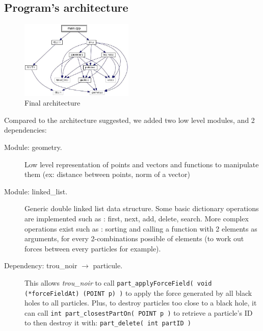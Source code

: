 \documentclass[a4paper]{article} %
\begin{document}
\begin{multicols*}{2}
\section{Program's architecture}


\begin{figure}[H]
\centering
\includegraphics[width=0.48\textwidth]{architecture.jpg}
\caption{Final architecture}
\end{figure}


Compared to the architecture suggested, we added two low level modules, and 2 dependencies:
\begin{description}
\item[Module: geometry.]
Low level representation of points and vectors and functions to manipulate them (ex: distance between points, norm of a vector)


\item[Module: linked\_list.]
Generic double linked list data structure.
Some basic dictionary operations are implemented such as : first, next, add, delete, search.
More complex operations exist such as : sorting and calling a function with 2 elements as arguments, for every 2-combinations possible of elements
(to work out forces between every particles for example).


\item[Dependency: trou\_noir $\rightarrow$ particule.]
This allows \emph{trou\_noir} to call \texttt{part\_applyForceField( void (*forceFieldAt) (POINT p) )}
to apply the force generated by all black holes to all particles.
Plus, to destroy particles too close to a black hole, it can call \texttt{int part\_closestPartOn( POINT p )}
to retrieve a particle's ID to then destroy it with: \texttt{part\_delete( int partID )}


\end{description}
\end{multicols*}
\end{document}
